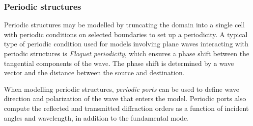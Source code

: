 \subsubsection*{Periodic structures}
Periodic structures may be modelled by truncating the domain into a single cell with periodic conditions on selected boundaries to set up a periodicity. A typical type of periodic condition used for models involving plane waves interacting with periodic structures is \emph{Floquet periodicity}, which ensures a phase shift between the tangential components of the wave. The phase shift is determined by a wave vector and the distance between the source and destination\cite{comsol_waveopticsmodule}. 

When modelling periodic structures, \emph{periodic ports} can be used to define wave direction and polarization of the wave that enters the model. Periodic ports also compute the reflected and transmitted diffraction orders as a function of incident angles and wavelength, in addition to the fundamental mode\cite{comsol_periodicstructures}.

\cleardoublepage







